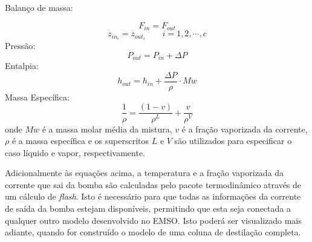 \begin{flushleft}
Balanço de massa:
\end{flushleft}
\begin{equation}
F_{in} = F_{out}
\end{equation}
\begin{equation}
z_{in_i} = z_{out_i}  \qquad i=1,2,\cdots,c
\end{equation}
Pressão:
\begin{equation}
P_{out} = P_{in} + \Delta P
\end{equation}
Entalpia:
\begin{equation}
h_{out} = h_{in} + \dfrac{\Delta P}{\rho} \cdot Mw
\end{equation}
Massa Específica:
\begin{equation}
\dfrac{1}{\rho} = \dfrac{(1-v)}{\rho^L} + \dfrac{v}{\rho^V}
\end{equation}
onde $Mw$ é a massa molar média da mistura, $v$ é a fração vaporizada da corrente, $\rho$ é a massa específica e
os superscritos $L$ e $V$ são utilizados para especificar o caso líquido e
vapor, respectivamente.

Adicionalmente às equações acima, a temperatura e a fração
vaporizada da corrente que sai da bomba são calculadas pelo pacote
termodinâmico através de um cálculo de \textit{flash}.
Isto é necessário para
que todas as informações da corrente de saída da bomba estejam disponíveis, permitindo que esta seja conectada
a qualquer outro modelo desenvolvido no EMSO.
Isto poderá ser visualizado mais adiante, quando for construído o modelo de uma
coluna de destilação completa.


